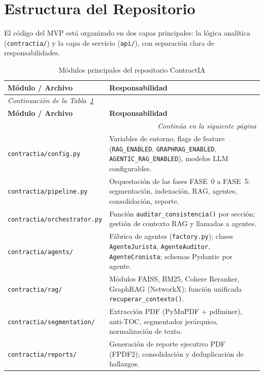 \section{Estructura del Repositorio}

El código del MVP está organizado en dos capas principales: la lógica analítica
(\texttt{contractia/}) y la capa de servicio (\texttt{api/}), con separación
clara de responsabilidades.

\begin{longtable}{p{5cm} p{9cm}}
\caption{Módulos principales del repositorio ContractIA}
\label{tab:repo} \\
\toprule
\textbf{Módulo / Archivo} & \textbf{Responsabilidad} \\
\midrule
\endfirsthead
\multicolumn{2}{l}{\small\itshape Continuación de la Tabla~\ref{tab:repo}} \\[4pt]
\toprule
\textbf{Módulo / Archivo} & \textbf{Responsabilidad} \\
\midrule
\endhead
\midrule
\multicolumn{2}{r}{\small\itshape Continúa en la siguiente página} \\
\endfoot
\bottomrule
\endlastfoot
\texttt{contractia/config.py} &
    Variables de entorno, flags de feature (\texttt{RAG\_ENABLED},
    \texttt{GRAPHRAG\_ENABLED}, \texttt{AGENTIC\_RAG\_ENABLED}),
    modelos LLM configurables. \\[6pt]
\texttt{contractia/pipeline.py} &
    Orquestación de las fases FASE~0 a FASE~5: segmentación,
    indexación, RAG, agentes, consolidación, reporte. \\[6pt]
\texttt{contractia/orchestrator.py} &
    Función \texttt{auditar\_consistencia()} por sección;
    gestión de contexto RAG y llamadas a agentes. \\[6pt]
\texttt{contractia/agents/} &
    Fábrica de agentes (\texttt{factory.py}); clases
    \texttt{AgenteJurista}, \texttt{AgenteAuditor},
    \texttt{AgenteCronista}; schemas Pydantic por agente. \\[6pt]
\texttt{contractia/rag/} &
    Módulos FAISS, BM25, Cohere Reranker, GraphRAG (NetworkX);
    función unificada \texttt{recuperar\_contexto()}. \\[6pt]
\texttt{contractia/segmentation/} &
    Extracción PDF (PyMuPDF + pdfminer), anti-TOC,
    segmentador jerárquico, normalización de texto. \\[6pt]
\texttt{contractia/reports/} &
    Generación de reporte ejecutivo PDF (FPDF2);
    consolidación y deduplicación de hallazgos. \\[6pt]

\end{longtable}
